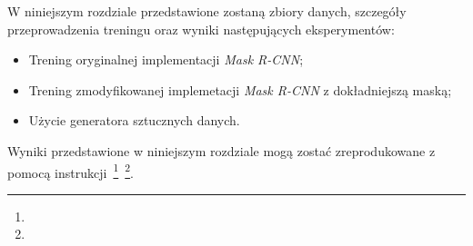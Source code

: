 
W niniejszym rozdziale przedstawione zostaną zbiory danych, szczegóły przeprowadzenia treningu oraz wyniki następujących eksperymentów:

\begin{itemize}
 \item Trening oryginalnej implementacji \textit{Mask R-CNN};
 \item Trening zmodyfikowanej implemetacji \textit{Mask R-CNN} z dokładniejszą maską;
 \item Użycie generatora sztucznych danych.
\end{itemize}

Wyniki przedstawione w niniejszym rozdziale mogą zostać zreprodukowane z pomocą instrukcji~\footnote{}~\footnote{}.
